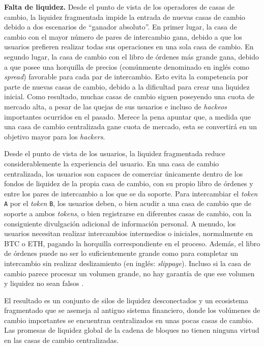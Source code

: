 \documentclass[UTF8,nofonts]{article}
\begin{document}
\begin{multicols}{2}
\textbf{Falta de liquidez.} Desde el punto de vista de los operadores de casas de cambio, la liquidez fragmentada impide la entrada de nuevas casas de cambio debido a dos escenarios de \enquote{ganador absoluto}. En primer lugar, la casa de cambio con el mayor número de pares de intercambio gana, debido a que los usuarios prefieren realizar todas sus operaciones en una sola casa de cambio. En segundo lugar, la casa de cambio con el libro de órdenes más grande gana, debido a que posee una horquilla de precios (comúnmente denominado en inglés como \textit{spread}) favorable para cada par de intercambio. Esto evita la competencia por parte de nuevas casas de cambio, debido a la dificultad para crear una liquidez inicial. Como resultado, muchas casas de cambio siguen poseyendo una cuota de mercado alta, a pesar de las quejas de sus usuarios e incluso de \textit{hackeos} importantes ocurridos en el pasado. Merece la pena apuntar que, a medida que una casa de cambio centralizada gane cuota de mercado, esta se convertirá en un objetivo mayor para los \textit{hackers}.

Desde el punto de vista de los usuarios, la liquidez fragmentada reduce considerablemente la experiencia del usuario. En una casa de cambio centralizada, los usuarios son capaces de comerciar únicamente dentro de los fondos de liquidez de la propia casa de cambio, con su propio libro de órdenes y entre los pares de intercambio a los que se da soporte. Para intercambiar el \textit{token} \verb|A| por el \textit{token} \verb|B|, los usuarios deben, o bien acudir a una casa de cambio que de soporte a ambos \textit{tokens}, o bien registrarse en diferentes casas de cambio, con la consiguiente divulgación adicional de información personal. A menudo, los usuarios necesitan realizar intercambios intermedios o iniciales, normalmente en BTC o ETH, pagando la horquilla correspondiente en el proceso. Además, el libro de órdenes puede no ser lo suficientemente grande como para completar un intercambio sin realizar deslizamiento (en inglés: \textit{slippage}). Incluso si la casa de cambio parece procesar un volumen grande, no hay garantía de que ese volumen y liquidez no sean falsos \cite{fakevolume}.

El resultado es un conjunto de silos de liquidez desconectados y un ecosistema fragmentado que se asemeja al antiguo sistema financiero, donde los volúmenes de cambio importantes se encuentran centralizados en unas pocas casas de cambio. Las promesas de liquidez global de la cadena de bloques no tienen ninguna virtud en las casas de cambio centralizadas.


\end{multicols}
\end{document}
